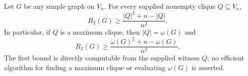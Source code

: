 Let \(G\) be any simple graph on \(V_n\).  For every supplied nonempty clique \(Q\subseteq V_n\),
\[
R_2(G)\geq\frac{|Q|^2+n-|Q|}{n^2}.
\]
In particular, if \(Q\) is a maximum clique, then \(|Q|=\omega(G)\) and
\[
R_2(G)\geq\frac{\omega(G)^2+n-\omega(G)}{n^2}.
\]
The first bound is directly computable from the supplied witness \(Q\); no efficient algorithm for finding a maximum clique or evaluating \(\omega(G)\) is asserted.